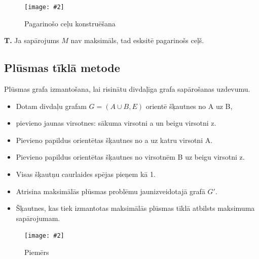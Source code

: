\documentclass{article}
\newcommand{\illustration}[3]{
	\begin{figure}[H]
		\centering	
		\texttt{[image: \#2]}
		\caption{#3}
	\end{figure}
}
\begin{document}
\illustration{1}{nepilni_pagar_celi-1}{Pagarinošo ceļu konstruēšana}

\textbf{T. } Ja sapārojums $M$ nav maksimāls, tad esksitē pagarinošs ceļš.

\subsection{Plūsmas tīklā metode}

Plūsmas grafa izmantošana, lai risinātu divdaļīga grafa sapārošanas uzdevumu.

\begin{itemize}
	 \item Dotam divdaļu grafam $G = (A \cup B, E )$ orientē šķautnes no A uz B,  \item pievieno jaunas virsotnes: sākuma virsotni a un beigu virsotni z.
	 \item Pievieno papildus orientētas šķautnes no a uz katru virsotni A. \item Pievieno papildus orientētas šķautnes no virsotnēm B uz beigu virsotni z.
	 \item Visas šķautņu caurlaides spējas pieņem kā 1.
	 \item Atrisina maksimālās plūsmas problēmu jaunizveidotajā grafā $G'$.  
	 \item Šķautnes, kas tiek izmantotas maksimālās plūsmas tīklā atbilsts maksimuma sapārojumam.
\end{itemize}

\illustration{1}{flow_pairing-1}{Piemērs}


\printindex
\end{document}
